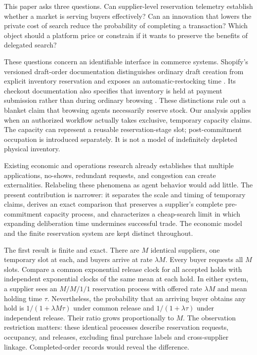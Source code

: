 \documentclass[11pt,a4paper]{article}
\begin{document}
This paper asks three questions. Can supplier-level reservation telemetry establish whether a market is serving buyers effectively? Can an innovation that lowers the private cost of search reduce the probability of completing a transaction? Which object should a platform price or constrain if it wants to preserve the benefits of delegated search?

These questions concern an identifiable interface in commerce systems. Shopify's versioned draft-order documentation distinguishes ordinary draft creation from explicit inventory reservation and exposes an automatic-restocking time \citep{shopify}. Its checkout documentation also specifies that inventory is held at payment submission rather than during ordinary browsing \citep{checkout}. These distinctions rule out a blanket claim that browsing agents necessarily reserve stock. Our analysis applies when an authorized workflow actually takes exclusive, temporary capacity claims. The capacity can represent a reusable reservation-stage slot; post-commitment occupation is introduced separately. It is not a model of indefinitely depleted physical inventory.

Existing economic and operations research already establishes that multiple applications, no-shows, redundant requests, and congestion can create externalities. Relabeling these phenomena as agent behavior would add little. The present contribution is narrower: it separates the scale and timing of temporary claims, derives an exact comparison that preserves a supplier's complete pre-commitment capacity process, and characterizes a cheap-search limit in which expanding deliberation time undermines successful trade. The economic model and the finite reservation system are kept distinct throughout.

The first result is finite and exact. There are $M$ identical suppliers, one temporary slot at each, and buyers arrive at rate $\lambda M$. Every buyer requests all $M$ slots. Compare a common exponential release clock for all accepted holds with independent exponential clocks of the same mean at each hold. In either system, a supplier sees an $M/M/1/1$ reservation process with offered rate $\lambda M$ and mean holding time $\tau$. Nevertheless, the probability that an arriving buyer obtains any hold is $1/(1+\lambda M\tau)$ under common release and $1/(1+\lambda\tau)$ under independent release. Their ratio grows proportionally to $M$. The observation restriction matters: these identical processes describe reservation requests, occupancy, and releases, excluding final purchase labels and cross-supplier linkage. Completed-order records would reveal the difference.
\end{document}

